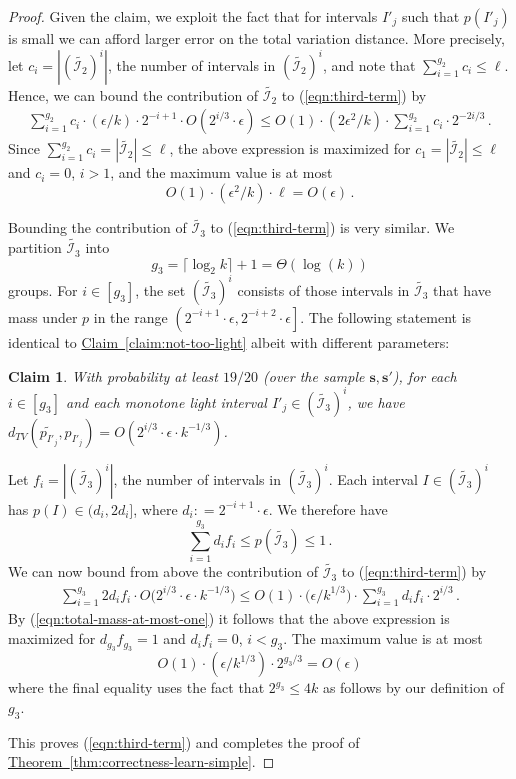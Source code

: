 \documentclass[10pt]{article}
\newtheorem{claim}[theorem]{Claim}
\theoremstyle{definition}
\numberwithin{equation}{section}
\newcommand{\expref}[2]{\texorpdfstring{\hyperref[#2]{#1~\ref{#2}}}{#1~\ref{#2}}}
\newcommand{\eps}{\epsilon}
\begin{document}
\begin{proof}
Given the claim, we exploit the fact that for intervals $I'_j$ such that $p(I'_j)$ is small
we can afford larger error on the total variation distance.
More precisely, let {$c_i  = |(\widetilde{\mathcal{I}_2})^i|$}, the number of intervals in
{$(\widetilde{\mathcal{I}_2})^i$}, and note that {$\sum_{i=1}^{g_2} c_i \leq \ell$}.
Hence, we can bound the contribution of {$\widetilde{\mathcal{I}_2}$} to (\ref{eqn:third-term}) by
\begin{eqnarray*}
\sum_{i=1}^{g_2} c_i  \cdot (\eps/k) \cdot 2^{-i+1} \cdot  O(2^{i/3} \cdot \eps)
\leq O(1) \cdot (2\eps^2/k) \cdot \sum_{i=1}^{g_2} c_i \cdot 2^{-2i/3}\,.
\end{eqnarray*}
Since  {$\sum_{i=1}^{g_2} c_i = |\widetilde{\mathcal{I}_2}|   \leq \ell$}, the above expression is maximized for
{$c_1= |\widetilde{\mathcal{I}_2}| \le \ell$ and $c_i = 0$, $i >1$,} and the maximum value is at most
{$$O(1) \cdot (\eps^2/k) \cdot \ell = O(\eps)\,.$$} 
{Bounding the contribution of $\widetilde{\mathcal{I}_3}$ to (\ref{eqn:third-term}) is very similar.
We partition
$\widetilde{\mathcal{I}_3}$ into
\[
g_3 = \lceil \log_2 k \rceil +1 =
\Theta (\log(k))
\]
groups.
For $i \in [{g_3}]$, the set $(\widetilde{\mathcal{I}_3})^i$
consists of those intervals in  $\widetilde{\mathcal{I}_3}$
that have mass under $p$ in the range $\left( 2^{-i+1} \cdot \eps, 2^{-i+2} \cdot \eps \right]$.
The following statement is identical to \expref{Claim}{claim:not-too-light} 
albeit with different parameters:
\begin{claim} \label{claim:heavy}
With probability at least $19/20$ (over the sample $\mathbf{s}, \mathbf{s'}$),
for each $i \in [g_3]$ and each monotone light interval $I'_j \in (\widetilde{\mathcal{I}_3})^i${,} we have
$d_{TV}(\widetilde{p_{I'_j}},p_{I'_j}) = O(2^{i/3} \cdot \eps \cdot k^{-1/3})$.
\end{claim}
Let {$f_i  = |(\widetilde{\mathcal{I}_3})^i|$}, the number of intervals in $(\widetilde{\mathcal{I}_3})^i$. 
Each interval $I \in (\widetilde{\mathcal{I}_3})^i$ has $p(I) \in (d_i, 2d_i]$, where $d_i : = 2^{-i+1} \cdot \eps$.
We therefore have
\begin{equation} \label{eqn:total-mass-at-most-one}
\sum_{i=1}^{g_3} d_i  {f_i} \le p(\widetilde{\mathcal{I}_3}) \le 1\,.
\end{equation}
We can now bound from above the contribution of $\widetilde{\mathcal{I}_3}$ to (\ref{eqn:third-term}) by
\begin{eqnarray*}
\sum_{i=1}^{g_3} 2d_i  {f_i} \cdot  O\bigl(2^{i/3} \cdot \eps \cdot k^{-1/3}\bigr)
\leq O(1) \cdot \bigl(\eps/k^{1/3}\bigr) \cdot \sum_{i=1}^{g_3} d_i  {f_i} \cdot 2^{i/3}\,.
\end{eqnarray*}
By (\ref{eqn:total-mass-at-most-one}) it follows that the above expression is maximized for
$d_{g_3}  {f_{g_3}} = 1$ and $d_i  {f_i}= 0$, $i <g_3$. The maximum value is at most
$$O(1) \cdot (\eps/k^{1/3}) \cdot 2^{g_3/3} = O(\eps)$$
where the final equality uses the fact that $2^{g_3} \le 4k$ as follows by our definition of $g_3$. 
}
This proves  (\ref{eqn:third-term}) and completes the proof of \expref{Theorem}{thm:correctness-learn-simple}.
\end{proof}
\end{document}
